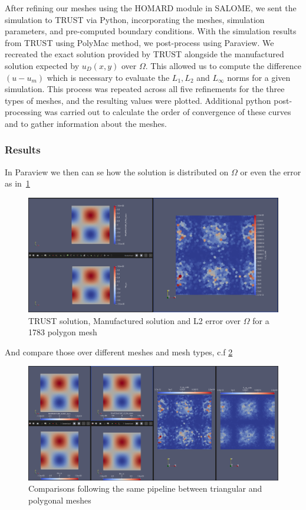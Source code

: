 \documentclass{article}
\begin{document}
After refining our meshes using the HOMARD module in SALOME, we sent the simulation to TRUST via Python, incorporating the meshes, simulation parameters, and pre-computed boundary conditions. With the simulation results from TRUST using PolyMac method, we post-process using Paraview. We recreated the exact solution provided by TRUST alongside the manufactured solution expected by $u_D(x,y)$ over $\Omega$. This allowed us to compute the difference $(u - u_m)$ which is necessary to evaluate the $L_1, L_2$ and $L_\infty$ norms for a given simulation. This process was repeated across all five refinements for the three types of meshes, and the resulting values were plotted. Additional python post-processing was carried out to calculate the order of convergence of these curves and to gather information about the meshes.

\subsubsection{Results}
In Paraview we then can se how the solution is distributed on $\Omega$ or even the error as in~\cref{polyPipeline}
\begin{figure}[htbp]
	\centering
	\includegraphics[width=1.0\textwidth]{./Images/polyPipeline.png}
	\caption{\label{polyPipeline} TRUST solution, Manufactured solution and L2 error over $\Omega$ for a 1783 polygon mesh}
\end{figure}
And compare those over different meshes and mesh types, c.f \cref{comTRI_POLY}
\begin{figure}[htbp]
	\centering
	\includegraphics[width=1.0\textwidth]{./Images/comTRI_POLY.png}
	\caption{\label{comTRI_POLY} Comparisons following the same pipeline between triangular and polygonal meshes}
\end{figure}
\end{document}
